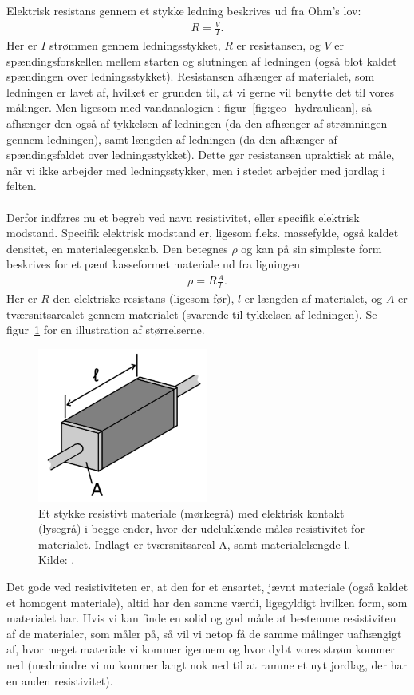 Elektrisk resistans gennem et stykke ledning beskrives ud fra Ohm's lov:
\begin{align}\label{eq:geo_ohm}
    R = \frac{V}{I}.
\end{align}
Her er $I$ strømmen gennem ledningsstykket, $R$ er resistansen, og $V$ er spændingsforskellen mellem starten og slutningen af ledningen (også blot kaldet spændingen over ledningsstykket). Resistansen afhænger af materialet, som ledningen er lavet af, hvilket er grunden til, at vi gerne vil benytte det til vores målinger. Men ligesom med vandanalogien i figur~\ref{fig:geo_hydraulican}, så afhænger den også af tykkelsen af ledningen (da den afhænger af strømningen gennem ledningen), samt længden af ledningen (da den afhænger af spændingsfaldet over ledningsstykket). Dette gør resistansen upraktisk at måle, når vi ikke arbejder med ledningsstykker, men i stedet arbejder med jordlag i felten. \\ \\
%
%
Derfor indføres nu et begreb ved navn resistivitet, eller specifik elektrisk modstand. Specifik elektrisk modstand er, ligesom f.eks. massefylde, også kaldet densitet, en materialeegenskab. Den betegnes $\rho$ og kan på sin simpleste form beskrives for et pænt kasseformet materiale ud fra ligningen
\begin{align}
    \rho = R \frac{A}{l}.
\end{align}
Her er $R$ den elektriske resistans (ligesom før), $l$ er længden af materialet, og $A$ er tværsnitsarealet gennem materialet (svarende til tykkelsen af ledningen). Se figur~\ref{fig:geo_resistans} for en illustration af størrelserne.
\begin{figure}[h]
    \centering
    \includegraphics[width = 0.5\textwidth]{Geo/Figurer/resistivity_geometry.pdf}
    \caption{Et stykke resistivt materiale (mørkegrå) med elektrisk kontakt (lysegrå) i begge ender, hvor der udelukkende måles resistivitet for materialet. Indlagt er tværsnitsareal A, samt materialelængde l.
    Kilde: \cite{ElectricalResistanceConductance}.}
    \label{fig:geo_resistans}
\end{figure}
Det gode ved resistiviteten er, at den for et ensartet, jævnt materiale (også kaldet et homogent materiale), altid har den samme værdi, ligegyldigt hvilken form, som materialet har. Hvis vi kan finde en solid og god måde at bestemme resistiviten af de materialer, som måler på, så vil vi netop få de samme målinger uafhængigt af, hvor meget materiale vi kommer igennem og hvor dybt vores strøm kommer ned (medmindre vi nu kommer langt nok ned til at ramme et nyt jordlag, der har en anden resistivitet).
%
